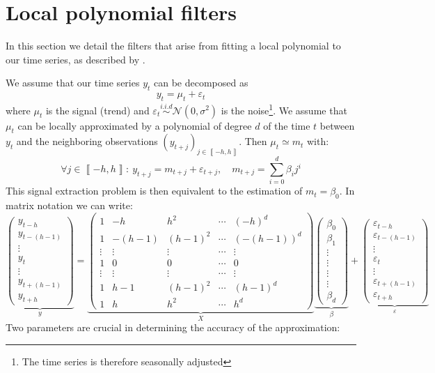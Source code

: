 \documentclass[
  12pt,
  ,
  a4paper]{article}
\newcommand\1{\mathds{1}}
\begin{document}
\hypertarget{sec:lppfilters}{%
\section{Local polynomial filters}\label{sec:lppfilters}}

In this section we detail the filters that arise from fitting a local polynomial to our time series, as described by \textcite{proietti2008}.

We assume that our time series \(y_t\) can be decomposed as
\[
y_t=\mu_t+\varepsilon_t
\]
where \(\mu_t\) is the signal (trend) and \(\varepsilon_{t}\overset{i.i.d}{\sim}\mathcal{N}(0,\sigma^{2})\) is the noise\footnote{The time series is therefore seasonally adjusted}.
We assume that \(\mu_t\) can be locally approximated by a polynomial of degree \(d\) of the time \(t\) between \(y_t\) and the neighboring observations \(\left(y_{t+j}\right)_{j\in\left\llbracket -h,h\right\rrbracket}\).
Then \(\mu_t\simeq m_{t}\) with:
\[
\forall j\in\left\llbracket -h,h\right\rrbracket :\:
y_{t+j}=m_{t+j}+\varepsilon_{t+j},\quad m_{t+j}=\sum_{i=0}^{d}\beta_{i}j^{i}
\]
This signal extraction problem is then equivalent to the estimation of \(m_t=\beta_0\). In matrix notation we can write:
\[
\underbrace{\begin{pmatrix}y_{t-h}\\
y_{t-(h-1)}\\
\vdots\\
y_{t}\\
\vdots\\
y_{t+(h-1)}\\
y_{t+h}
\end{pmatrix}}_{y}=\underbrace{\begin{pmatrix}1 & -h & h^{2} & \cdots & (-h)^{d}\\
1 & -(h-1) & (h-1)^{2} & \cdots & (-(h-1))^{d}\\
\vdots & \vdots & \vdots & \cdots & \vdots\\
1 & 0 & 0 & \cdots & 0\\
\vdots & \vdots & \vdots & \cdots & \vdots\\
1 & h-1 & (h-1)^{2} & \cdots & (h-1)^{d}\\
1 & h & h^{2} & \cdots & h^{d}
\end{pmatrix}}_{X}\underbrace{\begin{pmatrix}\beta_{0}\\
\beta_{1}\\
\vdots\\
\vdots\\
\vdots\\
\vdots\\
\beta_{d}
\end{pmatrix}}_{\beta}+\underbrace{\begin{pmatrix}\varepsilon_{t-h}\\
\varepsilon_{t-(h-1)}\\
\vdots\\
\varepsilon_{t}\\
\vdots\\
\varepsilon_{t+(h-1)}\\
\varepsilon_{t+h}
\end{pmatrix}}_{\varepsilon}
\]
Two parameters are crucial in determining the accuracy of the approximation:
\end{document}
